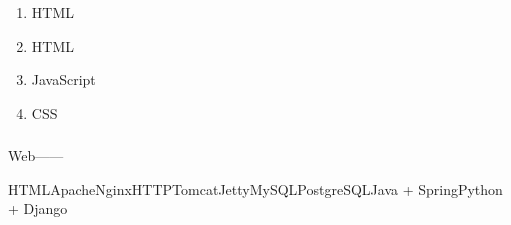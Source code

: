 \begin{enumerate}
\def\labelenumi{\arabic{enumi}.}
\item
  HTML
\item
  \important{}HTML
\item
  JavaScript
\item
  \important{}CSS
\end{enumerate}

\hypertarget{section-17}{%
\subsubsection{}\label{section-17}}

Web\important{}------

\important{}HTMLApacheNginxHTTP\important{}TomcatJetty\important{}MySQLPostgreSQL\important{}Java
+ SpringPython + Django

